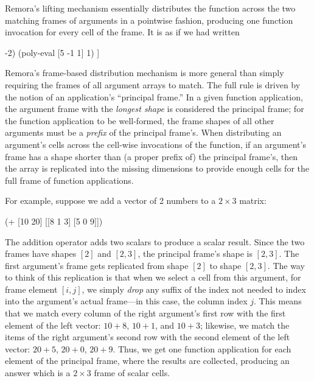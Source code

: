Remora's lifting mechanism essentially distributes the 
function across the two matching frames of arguments in a pointwise fashion,
producing one function invocation for every cell of the frame.
It is as if we had written
\begin{code}
    [ (poly-eval [2  0 -3] -2)
      (poly-eval [5 -1  1]  1) ]
\result{[-10 5]}\end{code}


Remora's frame-based distribution mechanism is more general than
simply requiring the frames of all argument arrays to match.
The full rule is driven by the notion of an application's ``principal frame.''
In a given function application,
the argument frame with the \emph{longest shape} is
considered the principal frame;
for the function application to be well-formed,
the frame shapes of all other arguments
must be a \emph{prefix} of the principal frame's.
When distributing an argument's cells 
across the cell-wise invocations of the function,
if an argument's frame has a shape shorter than
(a proper prefix of) the principal frame's,
then the array is replicated into the missing dimensions to provide
enough cells for the full frame of function applications.

For example, suppose we add a vector of 2 numbers to a $2 \times 3$ matrix:
\begin{code}
    (+ [10 20] [[8 1 3]
                [5 0 9]])
\result{[[18 11 13]
 [25 20 29]]}\end{code}
The addition operator adds two scalars to produce a scalar result.
Since the two frames have shapes $[2]$ and $[2, 3]$, 
the principal frame's shape is $[2, 3]$.
The first argument's frame gets replicated from shape $[2]$
to shape $[2, 3]$.
The way to think of this replication is that
when we select a cell from this argument, for frame element $[i,j]$,
we simply \emph{drop} any suffix of the index not needed
to index into the argument's actual frame---in this case, the column index $j$.
This means that we match every column of the right argument's first row with
the first element of the left vector: $10+8$, $10+1$, and $10+3$;
likewise, we match the items of the right argument's second row with
the second element of the left vector: $20+5$, $20+0$, $20+9$.
Thus, we get one function application for each element of the principal frame,
where the results are collected,
producing an answer which is a $2 \times 3$ frame of scalar cells.

